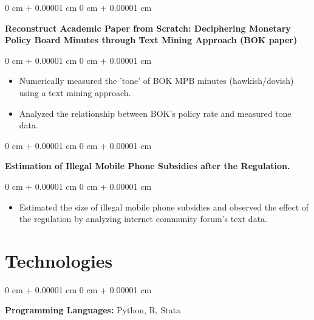 \documentclass[10pt, letterpaper]{article}
\newenvironment{highlights}{
    \begin{itemize}[
        topsep=0.10 cm,
        parsep=0.10 cm,
        partopsep=0pt,
        itemsep=0pt,
        leftmargin=0 cm + 10pt
    ]
}{
    \end{itemize}
} %
\newenvironment{onecolentry}{
    \begin{adjustwidth}{
        0 cm + 0.00001 cm
    }{
        0 cm + 0.00001 cm
    }
}{
    \end{adjustwidth}
} %
\begin{document}
        \vspace{0.2 cm}

        \begin{onecolentry}
            \textbf{Reconstruct Academic Paper from Scratch: Deciphering Monetary Policy Board Minutes through Text Mining Approach (BOK paper)}\end{onecolentry}

        \vspace{0.10 cm}
        \begin{onecolentry}
            \begin{highlights}
                \item Numerically measured the 'tone' of BOK MPB minutes (hawkish/dovish) using a text mining approach.
                \item Analyzed the relationship between BOK's policy rate and measured tone data.
            \end{highlights}
        \end{onecolentry}


        \vspace{0.2 cm}

        \begin{onecolentry}
            \textbf{Estimation of Illegal Mobile Phone Subsidies after the Regulation.}\end{onecolentry}

        \vspace{0.10 cm}
        \begin{onecolentry}
            \begin{highlights}
                \item Estimated the size of illegal mobile phone subsidies and observed the effect of the regulation by analyzing internet community forum's text data.
            \end{highlights}
        \end{onecolentry}



    
    \section{Technologies}



        
        \begin{onecolentry}
            \textbf{Programming Languages:} Python, R, Stata
        \end{onecolentry}
\end{document}
